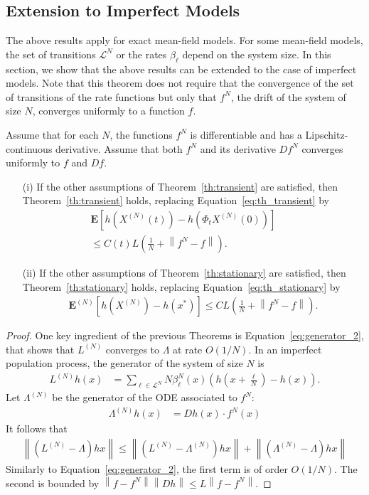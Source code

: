 \documentclass[sigconf]{acmart}
\newcommand\XN{X^{(N)}}
\newcommand\LN{L^{(N)}}
\newcommand\calL{\mathcal{L}}
\newcommand\esp[1]{\mathbf{E}\left[#1\right]}
\newcommand\espN[1]{\mathbf{E}^{(N)}\left[#1\right]}
\newcommand\norm[1]{\left\|#1\right\|}
\newcommand\p[1]{\left(#1\right)}
\begin{document}
\subsection{Extension to Imperfect Models}

The above results apply for exact mean-field models. For some
mean-field models, the set of transitions $\calL^N$ or the rates
$\beta_\ell$ depend on the system size. In this section, we show that
the above results can be extended to the case of imperfect models.
Note that this theorem does not require that the convergence of the
set of transitions of the rate functions but only that $f^N$, the
drift of the system of size $N$, converges uniformly to a function
$f$.

\begin{theorem}\label{th:imperfect}
  Assume that for each $N$, the functions $f^N$ is differentiable and
  has a Lipschitz-continuous derivative. Assume that both $f^N$ and
  its derivative $Df^N$ converges uniformly to $f$ and $Df$. 
  \begin{itemize}
  \item[(i)] If the other assumptions of Theorem~\ref{th:transient}
    are satisfied, then Theorem~\ref{th:transient} holds, replacing
    Equation~\eqref{eq:th_transient} by
    \begin{align*}
      \esp{h(\XN(t)) - h(\Phi_t\XN(0))} \qquad\\
      \le C(t)L\p{\frac{1}{N} + \norm{f^N-f}}. 
    \end{align*}
  \item[(ii)] If the other assumptions of Theorem~\ref{th:stationary}
    are satisfied, then Theorem~\ref{th:stationary} holds, replacing
    Equation~\eqref{eq:th_stationary} by
    \begin{align*}
      \espN{h(\XN)-h(x^*)} \le CL\p{\frac{1}{N} +
      \norm{f^N-f}}.
    \end{align*}
  \end{itemize}
\end{theorem}
\begin{proof}
  \newcommand\LNN{\widetilde{L}^{(N)}}
  \newcommand\LambdaN{\Lambda^{(N)}}
  
  One key ingredient of the previous Theorems is
  Equation~\eqref{eq:generator_2}, that shows that $\LN$ converges to
  $\Lambda$ at rate $O(1/N)$. In an imperfect population process, the
  generator of the system of size $N$ is
  \begin{align*}
    \LN h (x) &= \sum_{\ell\in\calL^N} N\beta^N_\ell(x) ( h(x+\frac{\ell}{N})-h(x) ).
  \end{align*}
  Let $\LambdaN$ be the generator of the ODE associated to $f^N$: 
  \begin{align*}
    \LambdaN h (x) &= D h(x) \cdot f^N(x)
  \end{align*}
  It follows that 
  \begin{align*}
    \norm{(\LN-\Lambda)hx} \le \norm{(\LN-\LambdaN)hx} +
    \norm{(\LambdaN-\Lambda)hx}
  \end{align*}
  Similarly to Equation~\eqref{eq:generator_2}, the first term is of
  order $O(1/N)$. The second is bounded by $\norm{f-f^N}\norm{Dh}\le
  L\norm{f-f^N}$. 
\end{proof}
\end{document}
